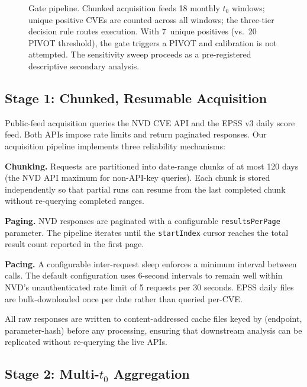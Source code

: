 \documentclass[conference]{IEEEtran}
\begin{document}
\begin{figure}[t]
\caption{Gate pipeline. Chunked acquisition feeds 18 monthly \(t_0\)
windows; unique positive CVEs are counted across all windows; the three-tier
decision rule routes execution. With 7~unique positives (vs.\ 20 PIVOT
threshold), the gate triggers a PIVOT and calibration is not attempted.
The sensitivity sweep proceeds as a pre-registered descriptive secondary
analysis.}
\label{fig:gate}
\end{figure}

\subsection{Stage 1: Chunked, Resumable Acquisition}
\label{subsec:acq}

Public-feed acquisition queries the NVD CVE API and the EPSS v3 daily score
feed. Both APIs impose rate limits and return paginated responses. Our
acquisition pipeline implements three reliability mechanisms:

\textbf{Chunking.} Requests are partitioned into date-range chunks of at
most 120 days (the NVD API maximum for non-API-key queries). Each chunk is
stored independently so that partial runs can resume from the last completed
chunk without re-querying completed ranges.

\textbf{Paging.} NVD responses are paginated with a configurable
\texttt{resultsPerPage} parameter. The pipeline iterates until the
\texttt{startIndex} cursor reaches the total result count reported in the
first page.

\textbf{Pacing.} A configurable inter-request sleep enforces a minimum
interval between calls. The default configuration uses 6-second intervals
to remain well within NVD's unauthenticated rate limit of 5 requests per
30 seconds. EPSS daily files are bulk-downloaded once per date rather than
queried per-CVE.

All raw responses are written to content-addressed cache files keyed by
(endpoint, parameter-hash) before any processing, ensuring that downstream
analysis can be replicated without re-querying the live APIs.

\subsection{Stage 2: Multi-\texorpdfstring{$t_0$}{t0} Aggregation}
\label{subsec:agg}
\end{document}
